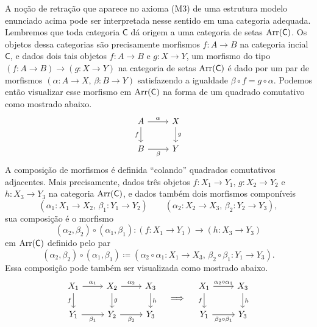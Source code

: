 \begin{obs}
  A noção de retração que aparece no axioma (M3) de uma estrutura modelo enunciado acima pode ser interpretada nesse sentido em uma categoria adequada.
  Lembremos que toda categoria $\mathsf{C}$ dá origem a uma categoria de setas $\mathrm{Arr}(\mathsf{C})$.
  Os objetos dessa categorias são precisamente morfismos $f: A \to B$ na categoria incial $\mathsf{C}$, e dados dois tais objetos $f: A \to B$ e $g: X \to Y$, um morfismo do tipo $(f: A \to B) \to (g: X \to Y)$ na categoria de setas $\mathrm{Arr}(\mathsf{C})$ é dado por um par de morfismos $(\alpha: A \to X,\, \beta: B \to Y)$ satisfazendo a igualdade $\beta \circ f = g \circ \alpha$.
  Podemos então visualizar esse morfismo em $\mathrm{Arr}(\mathsf{C})$ na forma de um quadrado comutativo como mostrado abaixo.
  \begin{displaymath}
    \begin{tikzcd}
      A
      \arrow[d, "f" swap]
      \arrow[r, "\alpha"]
      & X
      \arrow[d, "g"]
      \\ B
      \arrow[r, "\beta" swap]
      & Y
    \end{tikzcd}
  \end{displaymath}
  A composição de morfismos é definida ``colando'' quadrados comutativos adjacentes.
  Mais precisamente, dados três objetos $f: X_{1} \to Y_{1},\, g: X_{2} \to Y_{2}$ e $h: X_{3} \to Y_{3}$ na categoria $\mathrm{Arr}(\mathsf{C})$, e dados também dois morfismos componíveis
  \begin{displaymath}
    (\alpha_{1}: X_{1} \to X_{2},\, \beta_{1}: Y_{1} \to Y_{2}) \qquad (\alpha_{2}: X_{2} \to X_{3},\, \beta_{2}: Y_{2} \to Y_{3}),
  \end{displaymath}
  sua composição é o morfismo
  \begin{displaymath}
    (\alpha_{2}, \beta_{2}) \circ (\alpha_{1},\beta_{1}): (f: X_{1} \to Y_{1}) \to (h: X_{3} \to Y_{3})
  \end{displaymath}
  em $\mathrm{Arr}(\mathsf{C})$ definido pelo par
  \begin{displaymath}
    (\alpha_{2},\beta_{2}) \circ (\alpha_{1},\beta_{1}) \coloneqq (\alpha_{2} \circ \alpha_{1}: X_{1} \to X_{3},\, \beta_{2} \circ \beta_{1}: Y_{1} \to Y_{3}).
  \end{displaymath}
  Essa composição pode também ser visualizada como mostrado abaixo.
  \begin{displaymath}
    \begin{tikzcd}
      X_{1}
      \arrow[d, "f" swap]
      \arrow[r, "\alpha_{1}"]
      & X_{2}
      \arrow[d, "g"]
      \arrow[r, "\alpha_{2}"]
      & X_{3}
      \arrow[d, "h"]
      \\ Y_{1}
      \arrow[r, "\beta_{1}" swap]
      & Y_{2}
      \arrow[r, "\beta_{2}" swap]
      & Y_{3}
    \end{tikzcd}
    \quad \Longrightarrow \quad
    \begin{tikzcd}
      X_{1}
      \arrow[d, "f" swap]
      \arrow[r, "\alpha_{2} \circ \alpha_{1}"]
      & X_{3}
      \arrow[d, "h"]
      \\ Y_{1}
      \arrow[r, "\beta_{2} \circ \beta_{1}" swap]
      & Y_{3}
    \end{tikzcd}
  \end{displaymath}


\end{obs}
